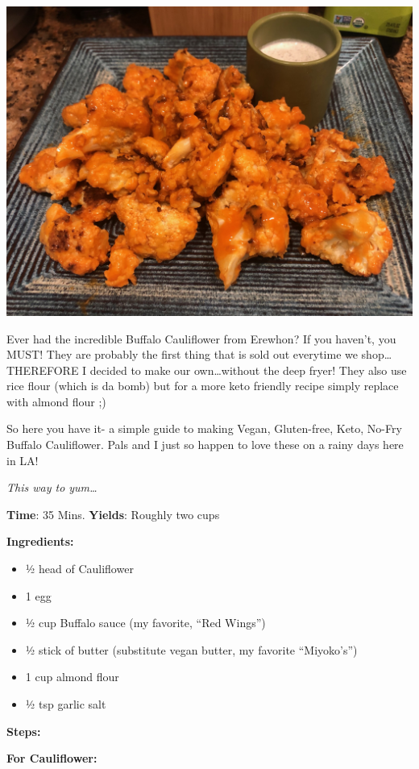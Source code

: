 \documentclass[]{book}
\providecommand{\tightlist}{%
  \setlength{\itemsep}{0pt}\setlength{\parskip}{0pt}}
\begin{document}
\includegraphics{../food.jpeg}

Ever had the incredible Buffalo Cauliflower from Erewhon? If you
haven't, you MUST! They are probably the first thing that is sold out
everytime we shop\ldots{}THEREFORE I decided to make our
own\ldots{}without the deep fryer! They also use rice flour (which is da
bomb) but for a more keto friendly recipe simply replace with almond
flour ;)

So here you have it- a simple guide to making Vegan, Gluten-free, Keto,
No-Fry Buffalo Cauliflower. Pals and I just so happen to love these on a
rainy days here in LA!

\emph{This way to yum\ldots{}}

\textbf{\textbf{Time}}: 35 Mins. \textbf{\textbf{Yields}}: Roughly two
cups

\textbf{\textbf{Ingredients:}}

\begin{itemize}
\tightlist
\item
  ½ head of Cauliflower
\item
  1 egg
\item
  ½ cup Buffalo sauce (my favorite, ``Red Wings'')
\item
  ½ stick of butter (substitute vegan butter, my favorite ``Miyoko's'')
\item
  1 cup almond flour
\item
  ½ tsp garlic salt
\end{itemize}

\textbf{\textbf{Steps:}}

\textbf{For Cauliflower:}
\end{document}

